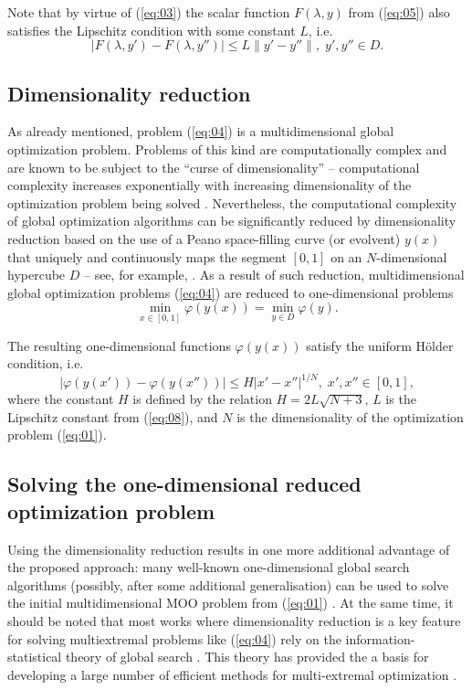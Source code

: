 \documentclass[runningheads]{llncs}
\begin{document}
Note that by virtue of (\ref{eq:03}) the scalar function $F(\lambda,y)$ from (\ref{eq:05}) also satisfies the Lipschitz condition with some constant $L$, i.e.
\begin{equation}
\label{eq:08}
|F(\lambda, y') - F(\lambda, y'')| \leq L\|y' - y''\|, \; y',y''\in D.
\end{equation}

\subsection{Dimensionality reduction} 
As already mentioned, problem (\ref{eq:04}) is a multidimensional global optimization problem. Problems of this kind are computationally complex and are known to be subject to the ``curse of dimensionality'' -- computational complexity increases exponentially with increasing dimensionality of the optimization problem being solved \cite{c13,c14,c15,c16,c17,c18,c19,c20}. Nevertheless, the computational complexity of global optimization algorithms can be significantly reduced by dimensionality reduction based on the use of a Peano space-filling curve (or evolvent) $y(x)$ that uniquely and continuously maps the segment $[0,1]$ on an $N$-dimensional hypercube $D$ -- see, for example, \cite{c15,c21}. As a result of such reduction, multidimensional global optimization problems (\ref{eq:04}) are reduced to one-dimensional problems
\begin{equation}
\label{eq:09}
\min_{x \in [0,1]} \varphi (y(x))= \min_{y \in D} \varphi(y).
\end{equation}

The resulting one-dimensional functions $\varphi(y(x))$ satisfy the uniform H{\" o}lder condition, i.e.
\begin{equation}
\label{eq:10}
|\varphi (y(x'))- \varphi (y(x''))| \leq H |x'-x''|^{1/N}, \; x',x''\in[0,1],
\end{equation}
where the constant $H$ is defined by the relation $H=2L\sqrt{N+3}$, $L$ is the Lipschitz constant from (\ref{eq:08}), and $N$ is the dimensionality of the optimization problem (\ref{eq:01}). 


\subsection{Solving the one-dimensional reduced optimization problem} 
Using the dimensionality reduction results in one more additional advantage of the proposed approach: many well-known one-dimensional global search algorithms (possibly, after some additional generalisation) can be used to solve the initial multidimensional MOO problem from (\ref{eq:01}) \cite{c22,c23,c24,c25,c26,c27,c28,c29}. At the same time, it should be noted that most works where dimensionality reduction is a key feature for solving multiextremal problems like (\ref{eq:04}) rely on the information-statistical theory of global search \cite{c15}. This theory has provided the a basis for developing a large number of efficient methods for multi-extremal optimization \cite{c28,c29,c30,c31,c32,c33,c34,c35,c36,c37}.
\end{document}
